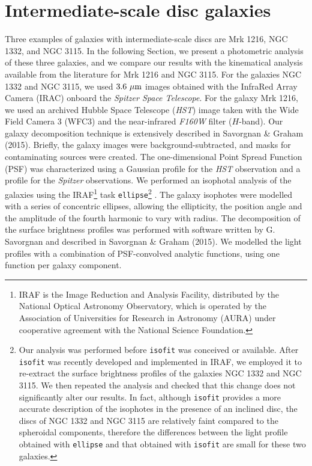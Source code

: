 \documentclass[useAMS,usenatbib,article]{mnras}
\begin{document}
\section{Intermediate-scale disc galaxies}
\label{sec:gal}
Three examples of galaxies with intermediate-scale discs are Mrk 1216, NGC 1332, and NGC 3115. 
In the following Section, we present a photometric analysis of these three galaxies, 
and we compare our results with the kinematical analysis available from the literature for Mrk 1216 and NGC 3115. 
For the galaxies NGC 1332 and NGC 3115, we used $3.6~\rm \mu m$ images obtained with the InfraRed Array Camera (IRAC) 
onboard the \emph{Spitzer Space Telescope}. 
For the galaxy Mrk 1216, we used an archived Hubble Space Telescope (\emph{HST}) image  
taken with the Wide Field Camera 3 (WFC3) and the near-infrared \emph{F160W} filter ($H$-band). 
Our galaxy decomposition technique is extensively described in Savorgnan \& Graham (2015).
Briefly, the galaxy images were background-subtracted, and masks for contaminating sources were created. 
The one-dimensional Point Spread Function (PSF) was characterized using a Gaussian profile for the \emph{HST} observation 
and a \cite{moffat1969} profile for the \emph{Spitzer} observations.
We performed an isophotal analysis of the galaxies using the IRAF\footnote{IRAF 
is the Image Reduction and Analysis Facility, distributed by the National Optical Astronomy Observatory, 
which is operated by the Association of Universities for Research in Astronomy (AURA) 
under cooperative agreement with the National Science Foundation.} task {\tt ellipse}\footnote{Our analysis 
was performed before {\tt isofit} \citep{ciambur2015} was conceived or available. 
After {\tt isofit} was recently developed and implemented in IRAF, 
we employed it to re-extract the surface brightness profiles of the galaxies NGC 1332 and NGC 3115. 
We then repeated the analysis and checked that this change does not significantly alter our results. 
In fact, although {\tt isofit} provides a more accurate description of the isophotes in the presence of an inclined disc, 
the discs of NGC 1332 and NGC 3115 are relatively faint compared to the spheroidal components, 
therefore the differences between the light profile obtained with {\tt ellipse} and that obtained with {\tt isofit} 
are small for these two galaxies. } 
\citep{taskellipse}. 
The galaxy isophotes were modelled with a series of concentric ellipses, 
allowing the ellipticity, the position angle and the amplitude of the fourth harmonic to vary with radius.  
The decomposition of the surface brightness profiles was performed with software written by G. Savorgnan 
and described in Savorgnan \& Graham (2015).
We modelled the light profiles with a combination of PSF-convolved analytic functions, 
using one function per galaxy component. 
\end{document}
